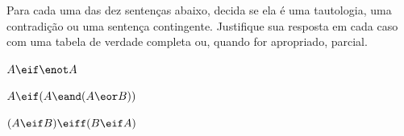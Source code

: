 \problempart
\label{pr.TT.TTorC3}
Para cada uma das dez sentenças abaixo, decida se ela é uma tautologia, uma contradição ou uma sentença contingente.
Justifique sua resposta em cada caso com uma tabela de verdade completa ou, quando for apropriado, parcial.


\begin{earg}
\item  $A \eif \enot A$ \vspace{.5ex}							

%
\item $A \eif (A \eand (A \eor B))$ \vspace{.5ex}	

%

\item $(A \eif B) \eiff (B \eif A)$ 	\vspace{.5ex}				%
%
%
%


\end{earg}
